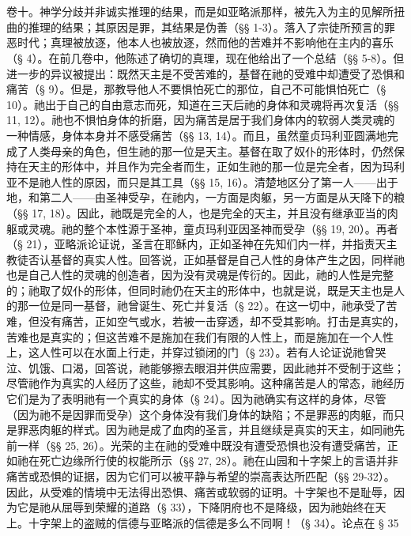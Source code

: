 

\section{}

卷十。神学分歧并非诚实推理的结果，而是如亚略派那样，被先入为主的见解所扭曲的推理的结果；其原因是罪，其结果是伪善（§§ 1-3）。落入了宗徒所预言的罪恶时代；真理被放逐，他本人也被放逐，然而他的苦难并不影响他在主内的喜乐（§ 4）。在前几卷中，他陈述了确切的真理，现在他给出了一个总结（§§ 5-8）。但进一步的异议被提出：既然天主是不受苦难的，基督在祂的受难中却遭受了恐惧和痛苦（§ 9）。但是，那教导他人不要惧怕死亡的那位，自己不可能惧怕死亡（§ 10）。祂出于自己的自由意志而死，知道在三天后祂的身体和灵魂将再次复活（§§ 11, 12）。祂也不惧怕身体的折磨，因为痛苦是居于我们身体内的软弱人类灵魂的一种情感，身体本身并不感受痛苦（§§ 13, 14）。而且，虽然童贞玛利亚圆满地完成了人类母亲的角色，但生祂的那一位是天主。基督在取了奴仆的形体时，仍然保持在天主的形体中，并且作为完全者而生，正如生祂的那一位是完全者，因为玛利亚不是祂人性的原因，而只是其工具（§§ 15, 16）。清楚地区分了第一人——出于地，和第二人——由圣神受孕，在祂内，一方面是肉躯，另一方面是从天降下的粮（§§ 17, 18）。因此，祂既是完全的人，也是完全的天主，并且没有继承亚当的肉躯或灵魂。祂的整个本性源于圣神，童贞玛利亚因圣神而受孕（§§ 19, 20）。再者（§ 21），亚略派论证说，圣言在耶稣内，正如圣神在先知们内一样，并指责天主教徒否认基督的真实人性。回答说，正如基督是自己人性的身体产生之因，同样祂也是自己人性的灵魂的创造者，因为没有灵魂是传衍的。因此，祂的人性是完整的；祂取了奴仆的形体，但同时祂仍在天主的形体中，也就是说，既是天主也是人的那一位是同一基督，祂曾诞生、死亡并复活（§ 22）。在这一切中，祂承受了苦难，但没有痛苦，正如空气或水，若被一击穿透，却不受其影响。打击是真实的，苦难也是真实的；但这苦难不是施加在我们有限的人性上，而是施加在一个人性上，这人性可以在水面上行走，并穿过锁闭的门（§ 23）。若有人论证说祂曾哭泣、饥饿、口渴，回答说，祂能够擦去眼泪并供应需要，因此祂并不受制于这些；尽管祂作为真实的人经历了这些，祂却不受其影响。这种痛苦是人的常态，祂经历它们是为了表明祂有一个真实的身体（§ 24）。因为祂确实有这样的身体，尽管（因为祂不是因罪而受孕）这个身体没有我们身体的缺陷；不是罪恶的肉躯，而只是罪恶肉躯的样式。因为祂是成了血肉的圣言，并且继续是真实的天主，如同祂先前一样（§§ 25, 26）。光荣的主在祂的受难中既没有遭受恐惧也没有遭受痛苦，正如祂在死亡边缘所行使的权能所示（§§ 27, 28）。祂在山园和十字架上的言语并非痛苦或恐惧的证据，因为它们可以被平静与希望的崇高表达所匹配（§§ 29-32）。因此，从受难的情境中无法得出恐惧、痛苦或软弱的证明。十字架也不是耻辱，因为它是祂从屈辱到荣耀的道路（§ 33），下降阴府也不是降级，因为祂始终在天上。十字架上的盗贼的信德与亚略派的信德是多么不同啊！（§ 34）。论点在 § 35 